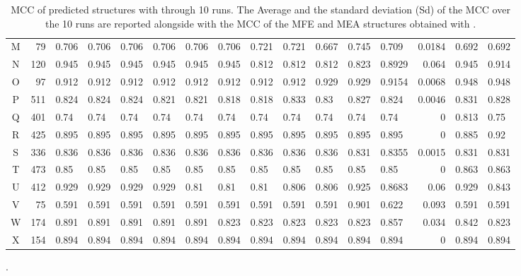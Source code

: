 \documentclass[11pt]{article} %
\begin{document}
\begin{table}[H]
\begin{adjustbox}{max width=1\textwidth,max totalheight=\textheight,keepaspectratio}
\begin{tabular}{crHHHHHHHHHHHrHH}
			M	&	79	&	0.706	&	0.706	&	0.706	&		0.706	&	0.706	&	0.706	&	0.721	&	0.721	&	0.667	&	0.745	&	0.709	&	0.0184	&	0.692	&	0.692	\\
			N	&	120	&	0.945	&	0.945	&	0.945	&		0.945	&	0.945	&	0.945	&	0.812	&	0.812	&	0.812	&	0.823	&	0.8929	&	0.064	&	0.945	&	0.914	\\
			O	&	97	&	0.912	&	0.912	&	0.912	&		0.912	&	0.912	&	0.912	&	0.912	&	0.912	&	0.929	&	0.929	&	0.9154	&	0.0068	&	0.948	&	0.948	\\
			P	&	511	&	0.824	&	0.824	&	0.824	&		0.821	&	0.821	&	0.818	&	0.818	&	0.833	&	0.83	&	0.827	&	0.824	&	0.0046	&	0.831	&	0.828	\\
			Q	&	401	&	0.74	&	0.74	&	0.74	&		0.74	&	0.74	&	0.74	&	0.74	&	0.74	&	0.74	&	0.74	&	0.74	&	0	&	0.813	&	0.75	\\
			R	&	425	&	0.895	&	0.895	&	0.895	&		0.895	&	0.895	&	0.895	&	0.895	&	0.895	&	0.895	&	0.895	&	0.895	&	0	&	0.885	&	0.92	\\
			S	&	336	&	0.836	&	0.836	&	0.836	&		0.836	&	0.836	&	0.836	&	0.836	&	0.836	&	0.836	&	0.831	&	0.8355	&	0.0015	&	0.831	&	0.831	\\
			T	&	473	&	0.85	&	0.85	&	0.85	&		0.85	&	0.85	&	0.85	&	0.85	&	0.85	&	0.85	&	0.85	&	0.85	&	0	&	0.863	&	0.863	\\
			U	&	412	&	0.929	&	0.929	&	0.929	&		0.929	&	0.81	&	0.81	&	0.81	&	0.806	&	0.806	&	0.925	&	0.8683	&	0.06	&	0.929	&	0.843	\\
			V	&	75	&	0.591	&	0.591	&	0.591	&		0.591	&	0.591	&	0.591	&	0.591	&	0.591	&	0.591	&	0.901	&	0.622	&	0.093	&	0.591	&	0.591	\\
			W	&	174	&	0.891	&	0.891	&	0.891	&		0.891	&	0.891	&	0.823	&	0.823	&	0.823	&	0.823	&	0.823	&	0.857	&	0.034	&	0.842	&	0.823	\\
			X	&	154	&	0.894	&	0.894	&	0.894	&		0.894	&	0.894	&	0.894	&	0.894	&	0.894	&	0.894	&	0.894	&	0.894	&	0	&	0.894	&	0.894	\\
			
			
			\bottomrule
		\end{tabular}
	\end{adjustbox}
	\caption{MCC of predicted structures with \OurTool{} through 10 runs. The Average and the standard deviation (Sd) of the MCC over the 10 runs are reported alongside with the MCC of the MFE and MEA structures obtained with .}.
\end{table}

\end{document}
